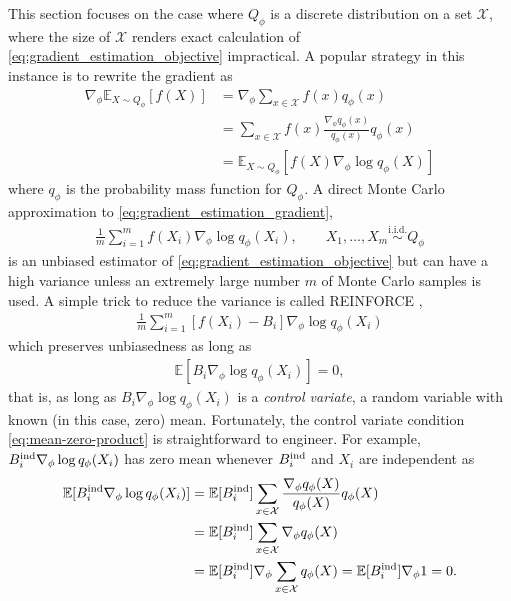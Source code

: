 \documentclass[12pt,paper=letter]{scrreprt}
\def\mbb#1{\mathbb{#1}}
\def\E{\mbb{E}} %
\newcommand{\grad}{\nabla} %
\begin{document}
This section focuses on the case where $Q_\phi$ is a discrete distribution on a set $\mathcal{X}$, where the size of $\mathcal{X}$ renders exact calculation of \eqref{eq:gradient_estimation_objective} impractical.
A popular strategy in this instance is to rewrite the gradient as
\begin{align}
\grad_{\phi}\mathbb{E}_{X \sim Q_\phi}[f(X)]
    & = \nabla_\phi \sum_{x \in \mathcal{X}} f(x) q_\phi(x) \nonumber \\ 
    & = \sum_{x \in \mathcal{X}} f(x) \frac{\nabla_\phi q_\phi(x)}{q_\phi(x)} q_\phi(x) \nonumber \\ 
    & = \mathbb{E}_{X \sim Q_\phi}[f(X) \nabla_\phi \log q_\phi(X)] \label{eq:gradient_estimation_gradient}
\end{align}
where $q_\phi$ is the probability mass function for $Q_\phi$.
A direct Monte Carlo approximation to \eqref{eq:gradient_estimation_gradient}, 
\begin{align*}
    \frac{1}{m} \sum_{i=1}^m f(X_i) \nabla_\phi \log q_\phi(X_i) , \qquad X_1,\dots,X_m \stackrel{\text{i.i.d.}}{\sim} Q_\phi
\end{align*}
is an unbiased estimator of \eqref{eq:gradient_estimation_objective} but can have a high variance unless an extremely large number $m$ of Monte Carlo samples is used.
A simple trick to reduce the variance is called REINFORCE \citep{glynn1990likelihood,williams1992simple},
\begin{align}
    \frac{1}{m} \sum_{i=1}^m [f(X_i) - B_i] \nabla_\phi \log q_\phi(X_i)  \label{eq: reinforce}
\end{align}
which preserves unbiasedness as long as 
\begin{align}\label{eq:mean-zero-product}
\E[B_i\grad_{\phi} \log q_\phi(X_i)] = 0,
\end{align}
that is, as long as $B_i\grad_{\phi} \log q_\phi(X_i)$ is a \emph{control variate}, a random variable with known (in this case, zero) mean. 
Fortunately, the control variate condition \cref{eq:mean-zero-product} is straightforward to engineer. For example, $B_i^{\textup{ind}}\grad_{\phi} \log q_\phi(X_i)$ has zero mean whenever $B_i^{\textup{ind}}$ and $X_i$ are independent as
\begin{align*}
    \mathbb{E}[B_i^{\textup{ind}} \nabla_\phi \log q_\phi(X_i)] 
    & = \mathbb{E}[B_i^{\textup{ind}}] \sum_{x \in \mathcal{X}} \frac{\nabla_\phi q_\phi(X)}{q_\phi(X)} q_\phi(X) \\
    & = \mathbb{E}[B_i^{\textup{ind}}] \sum_{x \in \mathcal{X}} \nabla_\phi q_\phi(X) \\
    & = \mathbb{E}[B_i^{\textup{ind}}] \nabla_\phi \sum_{x \in \mathcal{X}} q_\phi(X) 
    = \mathbb{E}[B_i^{\textup{ind}}] \nabla_\phi 1 = 0 .
\end{align*}
\end{document}
